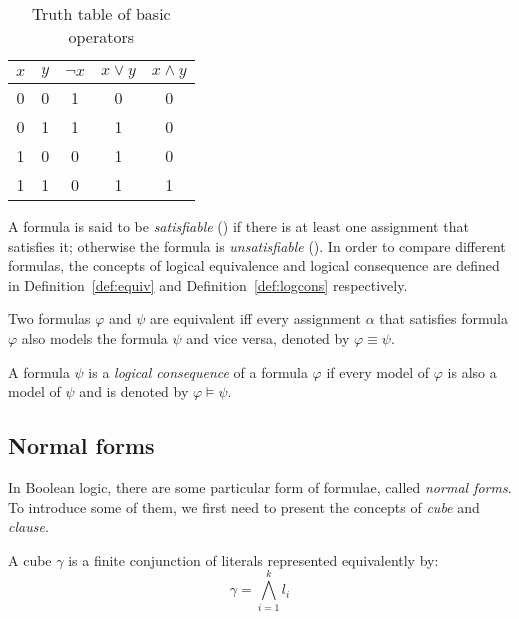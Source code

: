 \begin{table}[!htbp]
 \centering
 \begin{tabular}{cc|ccc}
  $x$ & $y$ & $\neg x$ & $x \lor y$ & $x \land y$ \\
  \toprule
  0 & 0 & 1 & 0 & 0 \\
  \midrule
  0 & 1 & 1 & 1 & 0 \\
  \midrule
  1 & 0 & 0 & 1 & 0 \\
  \midrule
  1 & 1 & 0 & 1 & 1 \\
  \bottomrule
 \end{tabular}
 \caption{Truth table of basic operators}
 \label{tab:truthtable}
\end{table}
A formula is said to be
\emph{satisfiable} (\sat) if there is at least one assignment that satisfies it;
otherwise the formula is \emph{unsatisfiable} (\unsat).
In order to compare different formulas, the concepts of logical equivalence and logical consequence
are defined in Definition~\ref{def:equiv} and Definition~\ref{def:logcons} respectively.

\vspace{1em}

\begin{definition}\label{def:equiv}
 Two formulas $\varphi$ and $\psi$ are equivalent iff every assignment $\alpha$ that satisfies 
 formula $\varphi$  also models the formula $\psi$ and vice versa, denoted by $\varphi \equiv \psi$.
\end{definition}


\begin{definition}\label{def:logcons}
 A formula $\psi$ is a \emph{logical consequence} of a formula $\varphi$ if every model of $\varphi$
 is also a model of $\psi$ and is denoted by $\varphi \models \psi$.
\end{definition}

\subsection{Normal forms}
In Boolean logic, there are some particular form of formulae, called \emph{normal forms}.
 To introduce some of them, we first need to present the concepts of \emph{cube} and \emph{clause}.
\begin{definition}[Cube]
A cube $\gamma$ is a finite conjunction of literals represented equivalently by:
$$\gamma = \bigwedge_{i=1}^k l_i $$
\end{definition}

